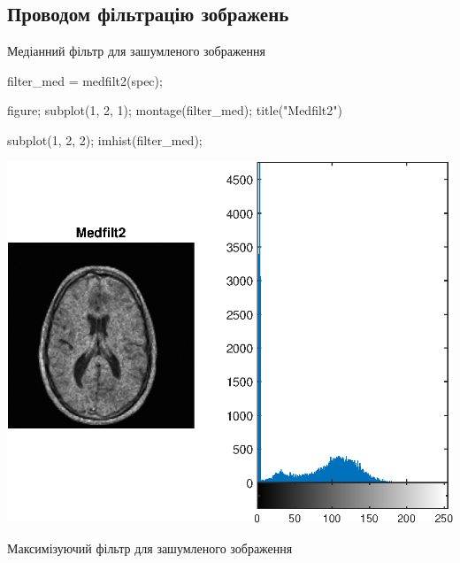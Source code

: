 \documentclass[12pt]{article}
\begin{document}
\subsection*{Проводом фільтрацію зображень}
\begin{par}
\begin{flushleft}
Медіанний фільтр для зашумленого зображення
\end{flushleft}
\end{par}

\begin{matlabcode}
filter_med = medfilt2(spec);

figure;
subplot(1, 2, 1);
montage(filter_med);
title("Medfilt2")

subplot(1, 2, 2);
imhist(filter_med);
\end{matlabcode}
\begin{center}
\includegraphics[width=\maxwidth{56.196688409433015em}]{figure_7}
\end{center}

\begin{par}
\begin{flushleft}
Максимізуючий фільтр для зашумленого зображення
\end{flushleft}
\end{par}
\end{document}
